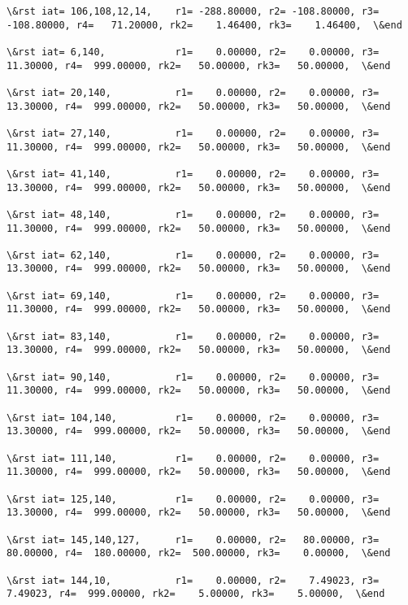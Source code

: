 \documentclass[11pt]{article}
\begin{document}
\begin{Verbatim}[commandchars=\\\{\}]
\&rst iat= 106,108,12,14,    r1= -288.80000, r2= -108.80000, r3= -108.80000, r4=   71.20000, rk2=    1.46400, rk3=    1.46400,  \&end

\&rst iat= 6,140,            r1=    0.00000, r2=    0.00000, r3=   11.30000, r4=  999.00000, rk2=   50.00000, rk3=   50.00000,  \&end

\&rst iat= 20,140,           r1=    0.00000, r2=    0.00000, r3=   13.30000, r4=  999.00000, rk2=   50.00000, rk3=   50.00000,  \&end

\&rst iat= 27,140,           r1=    0.00000, r2=    0.00000, r3=   11.30000, r4=  999.00000, rk2=   50.00000, rk3=   50.00000,  \&end

\&rst iat= 41,140,           r1=    0.00000, r2=    0.00000, r3=   13.30000, r4=  999.00000, rk2=   50.00000, rk3=   50.00000,  \&end

\&rst iat= 48,140,           r1=    0.00000, r2=    0.00000, r3=   11.30000, r4=  999.00000, rk2=   50.00000, rk3=   50.00000,  \&end

\&rst iat= 62,140,           r1=    0.00000, r2=    0.00000, r3=   13.30000, r4=  999.00000, rk2=   50.00000, rk3=   50.00000,  \&end

\&rst iat= 69,140,           r1=    0.00000, r2=    0.00000, r3=   11.30000, r4=  999.00000, rk2=   50.00000, rk3=   50.00000,  \&end

\&rst iat= 83,140,           r1=    0.00000, r2=    0.00000, r3=   13.30000, r4=  999.00000, rk2=   50.00000, rk3=   50.00000,  \&end

\&rst iat= 90,140,           r1=    0.00000, r2=    0.00000, r3=   11.30000, r4=  999.00000, rk2=   50.00000, rk3=   50.00000,  \&end

\&rst iat= 104,140,          r1=    0.00000, r2=    0.00000, r3=   13.30000, r4=  999.00000, rk2=   50.00000, rk3=   50.00000,  \&end

\&rst iat= 111,140,          r1=    0.00000, r2=    0.00000, r3=   11.30000, r4=  999.00000, rk2=   50.00000, rk3=   50.00000,  \&end

\&rst iat= 125,140,          r1=    0.00000, r2=    0.00000, r3=   13.30000, r4=  999.00000, rk2=   50.00000, rk3=   50.00000,  \&end

\&rst iat= 145,140,127,      r1=    0.00000, r2=   80.00000, r3=   80.00000, r4=  180.00000, rk2=  500.00000, rk3=    0.00000,  \&end

\&rst iat= 144,10,           r1=    0.00000, r2=    7.49023, r3=    7.49023, r4=  999.00000, rk2=    5.00000, rk3=    5.00000,  \&end


\end{Verbatim}
\end{document}
